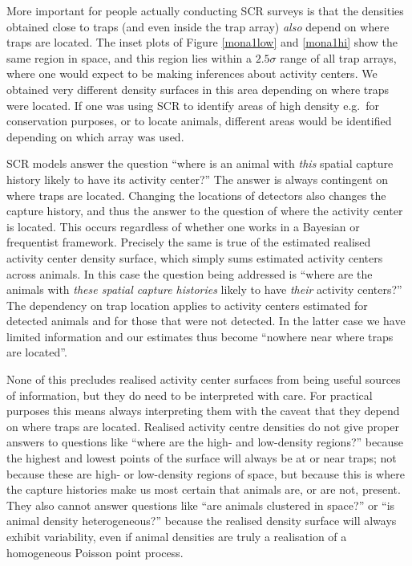 \documentclass[10pt,a4paper]{article}
\begin{document}
More important for people actually conducting SCR surveys is that the densities obtained close to traps (and even inside the trap array) {\it also} depend on where traps are located. The inset plots of Figure \ref{mona1low} and \ref{mona1hi} show the same region in space, and this region lies within a $2.5\sigma$ range of all trap arrays, where one would expect to be making inferences about activity centers. We obtained very different density surfaces in this area depending on where traps were located. If one was using SCR to identify areas of high density e.g.\ for conservation purposes, or to locate animals, different areas would be identified depending on which array was used. 

SCR models answer the question ``where is an animal with {\it this} spatial capture history likely to have its activity center?'' The answer is always contingent on where traps are located. Changing the locations of detectors also changes the capture history, and thus the answer to the question of where the activity center is located. This occurs regardless of whether one works in a Bayesian or frequentist framework. Precisely the same is true of the estimated realised activity center density surface, which simply sums estimated activity centers across animals. In this case the question being addressed is ``where are the animals with {\it these spatial capture histories} likely to have {\it their} activity centers?'' The dependency on trap location applies to activity centers estimated for detected animals and for those that were not detected. In the latter case we have limited information and our estimates thus become ``nowhere near where traps are located''. 

None of this precludes realised activity center surfaces from being useful sources of information, but they do need to be interpreted with care. For practical purposes this means always interpreting them with the caveat that they depend on where traps are located. Realised activity centre densities do not give proper answers to questions like ``where are the high- and low-density regions?'' because the highest and lowest points of the surface will always be at or near traps; not because these are high- or low-density regions of space, but because this is where the capture histories make us most certain that animals are, or are not, present. They also cannot answer questions like ``are animals clustered in space?'' or ``is animal density heterogeneous?'' because the realised density surface will always exhibit variability, even if animal densities are truly a realisation of a homogeneous Poisson point process.
\end{document}

